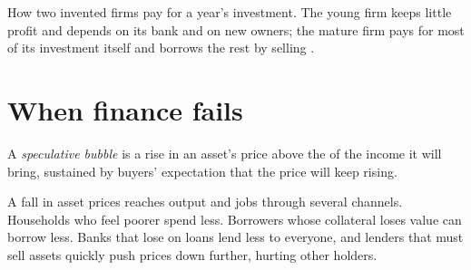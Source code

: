 \begin{omfigure}

{\small How two invented firms pay for a year's investment. The young firm keeps little profit and depends on its bank and on new owners; the mature firm pays for most of
its investment itself and borrows the rest by selling .}
\end{omfigure}

\section{When finance fails}\label{sec:g12:saving-and-investment:crises}

\begin{definition}\label{def:g12:saving-and-investment:bubble}
A \emph{speculative bubble} is a rise in an asset's price above the  of the income it will bring, sustained by buyers' expectation that
the price will keep rising.
\end{definition}

A fall in asset prices reaches output and jobs through several channels. Households who feel poorer spend less. Borrowers whose collateral loses value can borrow less. Banks
that lose on loans lend less to everyone, and lenders that must sell assets quickly push prices down further, hurting other holders.

